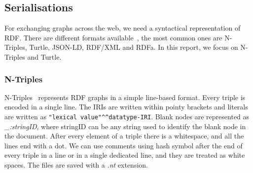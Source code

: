 

\subsection{Serialisations}
For exchanging graphs across the web, we need a syntactical representation of RDF. There are different formats available~\cite{W3C2011}, the most common ones are N-Triples, Turtle, JSON-LD, RDF/XML and RDFa. In this report, we focus on N-Triples and Turtle.

\subsubsection*{N-Triples}
N-Triples~\cite{Beckett} represents RDF graphs in a simple line-based format. Every triple is encoded in a single line. The IRIs are written within pointy brackets and literals are written as \texttt{"lexical value"\textasciicircum \textasciicircum datatype-IRI}. Blank nodes are represented as \textit{\_:stringID}, where stringID can be any string used to identify the blank node in the document. After every element of a triple there is a whitespace, and all the lines end with a dot. We can use comments using hash symbol after the end of every triple in a line or in a single dedicated line, and they are treated as white spaces. The files are saved with a \textit{.nt} extension.


